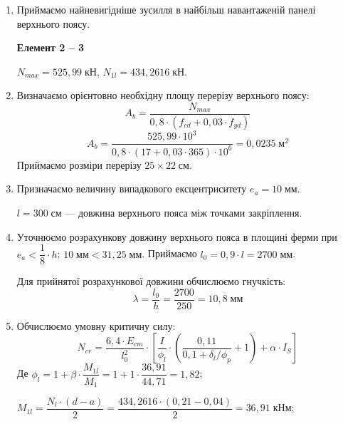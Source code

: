 \documentclass[a4paper,14pt]{article}
\begin{document}
\begin{enumerate}
    \item Приймаємо найневигідніше зусилля в найбільш навантаженій панелі\\верхнього поясу.
    
        \textbf{Елемент 2 -- 3}

        $N_{max} = 525,99\;\textit{кН}$, $N_{1l} = 434,2616\;\textit{кН}$.
    \item Визначаємо орієнтовно необхідну площу перерізу верхнього поясу:
        \begin{equation}
            A_b = \dfrac{N_{max}}{0,8 \cdot (f_{cd} + 0,03 \cdot f_{yd})}
        \end{equation}
        $$A_b = \dfrac{525,99 \cdot 10^3}{0,8 \cdot (17 + 0,03 \cdot 365) \cdot 10^6} = 0,0235\;\textit{м}^2$$
        Приймаємо розміри перерізу $25 \times 22\;\textit{см}$.
    \item Призначаємо величину випадкового ексцентриситету $e_a = 10\;\textit{мм}$.
        
        $l = 300\;\textit{см}$ --- довжина верхнього пояса між точками закріплення.
    \item Уточнюємо розрахункову довжину верхнього пояса в площині ферми при $e_a < \dfrac{1}{8} \cdot h$; $10\;\textit{мм} < 31,25\;\textit{мм}$. Приймаємо $l_0 = 0,9 \cdot l = 2700\;\textit{мм}$.

        Для прийнятої розрахункової довжини обчислюємо гнучкість:
        \begin{equation}
            \lambda = \dfrac{l_0}{h} = \dfrac{2700}{250} = 10,8\;\textit{мм}
        \end{equation}
    \item Обчислюємо умовну критичну силу:
        \begin{equation}
            N_{cr} = \dfrac{6,4 \cdot E_{cm}}{l_0^2} \cdot \left[\dfrac{I}{\phi_l} \cdot \left(\dfrac{0,11}{0,1 + \delta_l / \phi_p} + 1\right) + \alpha \cdot I_S\right]
        \end{equation}
        Де $\phi_l = 1 + \beta \cdot \dfrac{M_{1l}}{M_1} = 1 + 1 \cdot \dfrac{36,91}{44,71} = 1,82$;

        $M_{1l} = \dfrac{N_l \cdot (d - a)}{2} = \dfrac{434,2616 \cdot (0,21 - 0,04)}{2} = 36,91\;\textit{кНм}$;
        

\end{enumerate}
\end{document}

